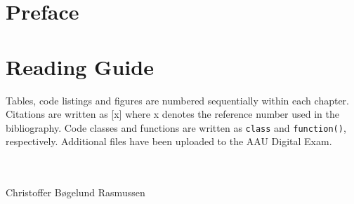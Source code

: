 \glsresetall
\section*{Preface}
\section*{Reading Guide}
Tables, code listings and figures are numbered sequentially within each chapter. Citations are written as [x] where x denotes the reference number used in the bibliography. Code classes and functions are written as \lstinline{class} and \lstinline{function()}, respectively.
Additional files have been uploaded to the AAU Digital Exam. 

\vfill
~\\
\makebox[8 cm]{\hrulefill}\\
Christoffer Bøgelund Rasmussen\\
~\\
